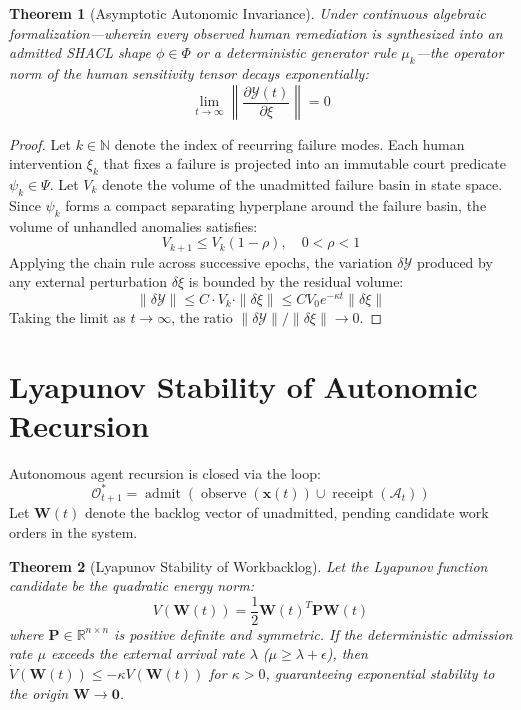 \documentclass[12pt,oneside,a4paper]{book}
\theoremstyle{definition}
\theoremstyle{plain}
\newtheorem{theorem}{Theorem}[chapter]
\theoremstyle{remark}
\DeclareMathOperator{\receipt}{receipt}
\DeclareMathOperator{\admit}{admit}
\DeclareMathOperator{\observe}{observe}
\begin{document}
\begin{theorem}[Asymptotic Autonomic Invariance]
Under continuous algebraic formalization—wherein every observed human remediation is synthesized into an admitted SHACL shape $\phi \in \Phi$ or a deterministic generator rule $\mu_k$—the operator norm of the human sensitivity tensor decays exponentially:
\begin{equation}
    \lim_{t \to \infty} \left\| \frac{\partial \mathcal{Y}(t)}{\partial \xi} \right\| = 0
\end{equation}
\end{theorem}

\begin{proof}
Let $k \in \mathbb{N}$ denote the index of recurring failure modes. Each human intervention $\xi_k$ that fixes a failure is projected into an immutable court predicate $\psi_k \in \Psi$.
Let $V_k$ denote the volume of the unadmitted failure basin in state space. Since $\psi_k$ forms a compact separating hyperplane around the failure basin, the volume of unhandled anomalies satisfies:
\begin{equation}
    V_{k+1} \le V_k (1 - \rho), \quad 0 < \rho < 1
\end{equation}
Applying the chain rule across successive epochs, the variation $\delta \mathcal{Y}$ produced by any external perturbation $\delta \xi$ is bounded by the residual volume:
\begin{equation}
    \|\delta \mathcal{Y}\| \le C \cdot V_k \cdot \|\delta \xi\| \le C V_0 e^{-\kappa t} \|\delta \xi\|
\end{equation}
Taking the limit as $t \to \infty$, the ratio $\|\delta \mathcal{Y}\| / \|\delta \xi\| \to 0$.
\end{proof}

\section{Lyapunov Stability of Autonomic Recursion}
Autonomous agent recursion is closed via the loop:
\begin{equation}
    \mathcal{O}^*_{t+1} = \admit(\observe(\mathbf{x}(t)) \cup \receipt(\mathcal{A}_t))
\end{equation}
Let $\mathbf{W}(t)$ denote the backlog vector of unadmitted, pending candidate work orders in the system.

\begin{theorem}[Lyapunov Stability of Workbacklog]
Let the Lyapunov function candidate be the quadratic energy norm:
\begin{equation}
    V(\mathbf{W}(t)) = \frac{1}{2} \mathbf{W}(t)^T \mathbf{P} \mathbf{W}(t)
\end{equation}
where $\mathbf{P} \in \mathbb{R}^{n \times n}$ is positive definite and symmetric. If the deterministic admission rate $\mu$ exceeds the external arrival rate $\lambda$ ($\mu \ge \lambda + \epsilon$), then $\dot{V}(\mathbf{W}(t)) \le -\kappa V(\mathbf{W}(t))$ for $\kappa > 0$, guaranteeing exponential stability to the origin $\mathbf{W} \to \mathbf{0}$.
\end{theorem}
\end{document}
